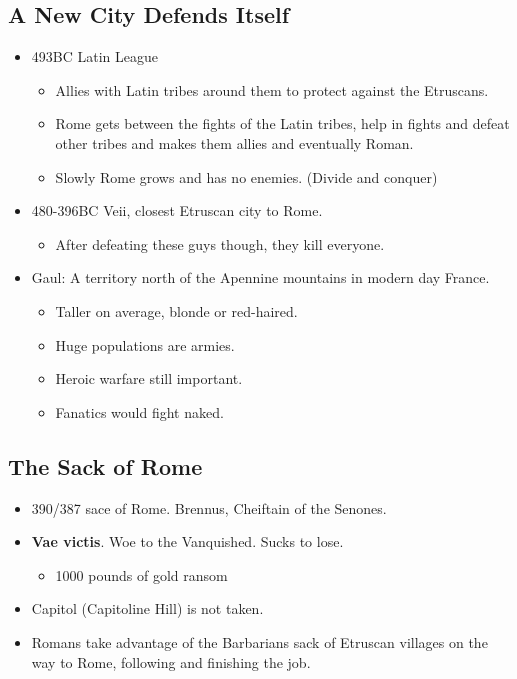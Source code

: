 \documentclass[12pt, twoside]{article}
\begin{document}
\subsection{A New City Defends Itself}
\begin{itemize}
\item 493BC Latin League
	\begin{itemize}
	\item Allies with Latin tribes around them to protect against the Etruscans.
	\item Rome gets between the fights of the Latin tribes, help in fights and defeat other tribes and makes them allies and eventually Roman.
	\item Slowly Rome grows and has no enemies. (Divide and conquer)
	\end{itemize}
\item 480-396BC Veii, closest Etruscan city to Rome.
	\begin{itemize}
	\item After defeating these guys though, they kill everyone.
	\end{itemize}
\item Gaul: A territory north of the Apennine mountains in modern day France.
	\begin{itemize}
	\item Taller on average, blonde or red-haired.
	\item Huge populations are armies.
	\item Heroic warfare still important.
	\item Fanatics would fight naked.
	\end{itemize}
\end{itemize}

\subsection{The Sack of Rome}
\begin{itemize}
\item 390/387 sace of Rome.  Brennus, Cheiftain of the Senones.
\item \textbf{Vae victis}.  Woe to the Vanquished.  Sucks to lose.
	\begin{itemize}
	\item 1000 pounds of gold ransom 
	\end{itemize}
\item Capitol (Capitoline Hill) is not taken.
\item Romans take advantage of the Barbarians sack of Etruscan villages on the way to Rome, following and finishing the job.
\end{itemize}
\end{document}
